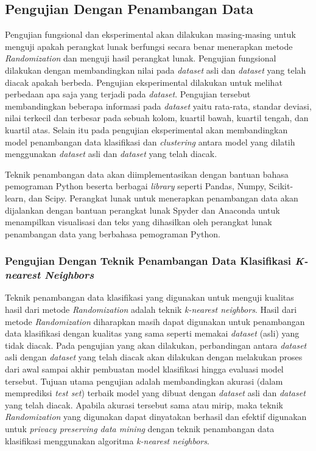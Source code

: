\subsection{Pengujian Dengan Penambangan Data}
\label{subsec:analisis-penambangan}

Pengujian fungsional dan eksperimental akan dilakukan masing-masing untuk menguji apakah perangkat lunak berfungsi secara benar menerapkan metode \textit{Randomization} dan menguji hasil perangkat lunak. Pengujian fungsional dilakukan dengan membandingkan nilai pada \textit{dataset} asli dan \textit{dataset} yang telah diacak apakah berbeda. Pengujian eksperimental dilakukan untuk melihat perbedaan apa saja yang terjadi pada \textit{dataset}. Pengujian tersebut membandingkan beberapa informasi pada \textit{dataset} yaitu rata-rata, standar deviasi, nilai terkecil dan terbesar pada sebuah kolom, kuartil bawah, kuartil tengah, dan kuartil atas. Selain itu pada pengujian eksperimental akan membandingkan model penambangan data klasifikasi dan \textit{clustering} antara model yang dilatih menggunakan \textit{dataset} asli dan \textit{dataset} yang telah diacak.

Teknik penambangan data akan diimplementasikan dengan bantuan bahasa pemograman Python beserta berbagai \textit{library} seperti Pandas, Numpy, Scikit-learn, dan Scipy. Perangkat lunak untuk menerapkan penambangan data akan dijalankan dengan bantuan perangkat lunak Spyder dan Anaconda untuk menampilkan visualisasi dan teks yang dihasilkan oleh perangkat lunak penambangan data yang berbahasa pemograman Python. 

\subsubsection{Pengujian Dengan Teknik Penambangan Data Klasifikasi \textit{K-nearest Neighbors}}
\label{subsubsec:analisis-knn}

Teknik penambangan data klasifikasi yang digunakan untuk menguji kualitas hasil dari metode \textit{Randomization} adalah teknik \textit{k-nearest neighbors}. Hasil dari metode \textit{Randomization} diharapkan masih dapat digunakan untuk penambangan data klasifikasi dengan kualitas yang sama seperti memakai \textit{dataset} (asli) yang tidak diacak. Pada pengujian yang akan dilakukan, perbandingan antara \textit{dataset} asli dengan \textit{dataset} yang telah diacak akan dilakukan dengan melakukan proses dari awal sampai akhir pembuatan model klasifikasi hingga evaluasi model tersebut. Tujuan utama pengujian adalah membandingkan akurasi (dalam memprediksi \textit{test set}) terbaik model yang dibuat dengan \textit{dataset} asli dan \textit{dataset} yang telah diacak. Apabila akurasi tersebut sama atau mirip, maka teknik \textit{Randomization} yang digunakan dapat dinyatakan berhasil dan efektif digunakan untuk \textit{privacy preserving data mining} dengan teknik penambangan data klasifikasi menggunakan algoritma \textit{k-nearest neighbors}.

